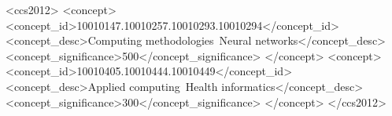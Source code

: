 \documentclass[acmsmall,screen,review]{acmart}
\begin{document}
\begin{CCSXML}
<ccs2012>
   <concept>
       <concept_id>10010147.10010257.10010293.10010294</concept_id>
       <concept_desc>Computing methodologies~Neural networks</concept_desc>
       <concept_significance>500</concept_significance>
       </concept>
   <concept>
       <concept_id>10010405.10010444.10010449</concept_id>
       <concept_desc>Applied computing~Health informatics</concept_desc>
       <concept_significance>300</concept_significance>
       </concept>
 </ccs2012>
\end{CCSXML}




\maketitle







\end{document}
